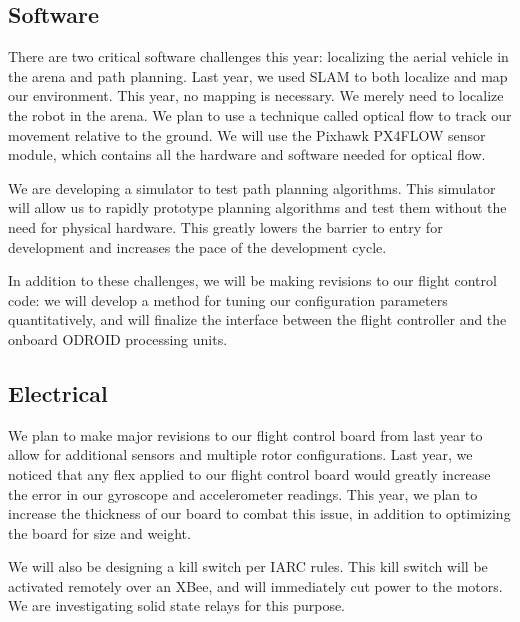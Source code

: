 \documentclass[12pt,letterpaper]{article}
\begin{document}
\subsection*{Software}
There are two critical software challenges this year: localizing the aerial
vehicle in the arena and path planning. Last year, we used SLAM to both localize
and map our environment. This year, no mapping is necessary. We merely need to
localize the robot in the arena. We plan to use a technique called optical flow
to track our movement relative to the ground. We will use the Pixhawk PX4FLOW
sensor module, which contains all the hardware and software needed for optical
flow.


We are developing a simulator to test path planning algorithms. This simulator
will allow us to rapidly prototype planning algorithms and test them without the
need for physical hardware. This greatly lowers the barrier to entry for
development and increases the pace of the development cycle.

In addition to these challenges, we will be making revisions to our flight
control code: we will develop a method for tuning our configuration parameters
quantitatively, and will finalize the interface between the flight controller
and the onboard ODROID processing units.

\subsection*{Electrical}
We plan to make major revisions to our flight control board from last year to
allow for additional sensors and multiple rotor configurations. Last year, we
noticed that any flex applied to our flight control board would greatly increase
the error in our gyroscope and accelerometer readings. This year, we plan to
increase the thickness of our board to combat this issue, in addition to
optimizing the board for size and weight.

We will also be designing a kill switch per IARC rules. This kill switch will be
activated remotely over an XBee, and will immediately cut power to the motors.
We are investigating solid state relays for this purpose.
\end{document}
